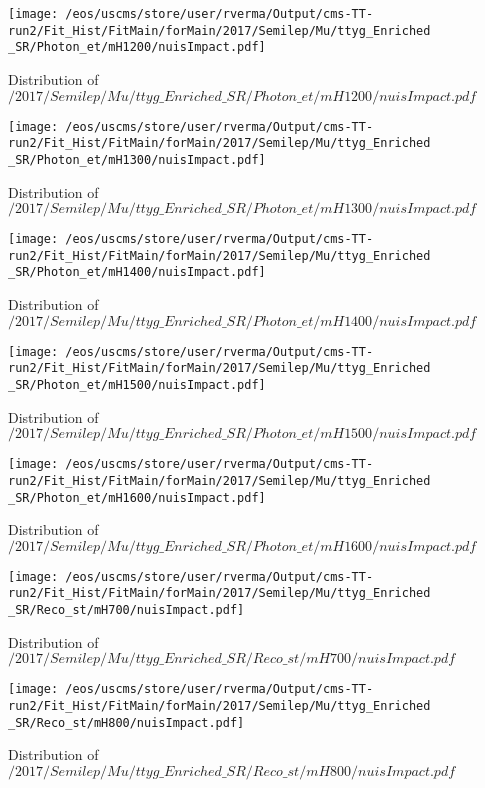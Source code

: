 \begin{figure}
\centering
\texttt{[image: /eos/uscms/store/user/rverma/Output/cms-TT-run2/Fit\_Hist/FitMain/forMain/2017/Semilep/Mu/ttyg\_Enriched\_SR/Photon\_et/mH1200/nuisImpact.pdf]}
\caption{Distribution of $/2017/Semilep/Mu/ttyg\_Enriched\_SR/Photon\_et/mH1200/nuisImpact.pdf$}
\end{figure}

\begin{figure}
\centering
\texttt{[image: /eos/uscms/store/user/rverma/Output/cms-TT-run2/Fit\_Hist/FitMain/forMain/2017/Semilep/Mu/ttyg\_Enriched\_SR/Photon\_et/mH1300/nuisImpact.pdf]}
\caption{Distribution of $/2017/Semilep/Mu/ttyg\_Enriched\_SR/Photon\_et/mH1300/nuisImpact.pdf$}
\end{figure}

\begin{figure}
\centering
\texttt{[image: /eos/uscms/store/user/rverma/Output/cms-TT-run2/Fit\_Hist/FitMain/forMain/2017/Semilep/Mu/ttyg\_Enriched\_SR/Photon\_et/mH1400/nuisImpact.pdf]}
\caption{Distribution of $/2017/Semilep/Mu/ttyg\_Enriched\_SR/Photon\_et/mH1400/nuisImpact.pdf$}
\end{figure}

\begin{figure}
\centering
\texttt{[image: /eos/uscms/store/user/rverma/Output/cms-TT-run2/Fit\_Hist/FitMain/forMain/2017/Semilep/Mu/ttyg\_Enriched\_SR/Photon\_et/mH1500/nuisImpact.pdf]}
\caption{Distribution of $/2017/Semilep/Mu/ttyg\_Enriched\_SR/Photon\_et/mH1500/nuisImpact.pdf$}
\end{figure}

\begin{figure}
\centering
\texttt{[image: /eos/uscms/store/user/rverma/Output/cms-TT-run2/Fit\_Hist/FitMain/forMain/2017/Semilep/Mu/ttyg\_Enriched\_SR/Photon\_et/mH1600/nuisImpact.pdf]}
\caption{Distribution of $/2017/Semilep/Mu/ttyg\_Enriched\_SR/Photon\_et/mH1600/nuisImpact.pdf$}
\end{figure}

\begin{figure}
\centering
\texttt{[image: /eos/uscms/store/user/rverma/Output/cms-TT-run2/Fit\_Hist/FitMain/forMain/2017/Semilep/Mu/ttyg\_Enriched\_SR/Reco\_st/mH700/nuisImpact.pdf]}
\caption{Distribution of $/2017/Semilep/Mu/ttyg\_Enriched\_SR/Reco\_st/mH700/nuisImpact.pdf$}
\end{figure}

\begin{figure}
\centering
\texttt{[image: /eos/uscms/store/user/rverma/Output/cms-TT-run2/Fit\_Hist/FitMain/forMain/2017/Semilep/Mu/ttyg\_Enriched\_SR/Reco\_st/mH800/nuisImpact.pdf]}
\caption{Distribution of $/2017/Semilep/Mu/ttyg\_Enriched\_SR/Reco\_st/mH800/nuisImpact.pdf$}
\end{figure}


